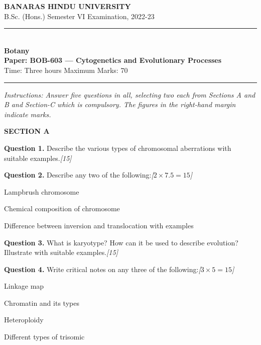 \documentclass[11pt,a4paper]{article}
\newcommand{\pts}[1]{\hfill   \textit{[#1]}}
\begin{document}
\begin{center}
  {\large\bfseries BANARAS HINDU UNIVERSITY}\\[2pt]
  {\normalsize B.Sc. (Hons.) Semester VI Examination, 2022-23}\\[6pt]
  \rule{0.8\linewidth}{0.5pt}\\[6pt]
  {\large\bfseries Botany}\\[4pt]
  {\large\bfseries Paper: BOB-603 --- Cytogenetics and Evolutionary Processes}\\[4pt]
  {\normalsize Time: Three hours \hfill Maximum Marks: 70}
\end{center}

\rule{\linewidth}{0.4pt}

\smallskip



\noindent   \textit{Instructions: Answer five questions in all, selecting two each from Sections A and B and Section-C which is compulsory. The figures in the right-hand margin indicate marks.}

\bigskip


\begin{center}
   \textbf{SECTION A}
\end{center}
\medskip

\medskip


\noindent   \textbf{Question 1.} Describe the various types of chromosomal aberrations with suitable examples.\pts{15}

\medskip


\noindent   \textbf{Question 2.} Describe any two of the following:\pts{$2  \times 7.5 = 15$}

\begin{parts}
  \item Lampbrush chromosome
  \item Chemical composition of chromosome
  \item Difference between inversion and translocation with examples
\end{parts}

\medskip


\noindent   \textbf{Question 3.} What is karyotype? How can it be used to describe evolution? Illustrate with suitable examples.\pts{15}

\medskip


\noindent   \textbf{Question 4.} Write critical notes on any three of the following:\pts{$3  \times 5 = 15$}

\begin{parts}
  \item Linkage map
  \item Chromatin and its types
  \item Heteroploidy
  \item Different types of trisomic
\end{parts}
\end{document}
